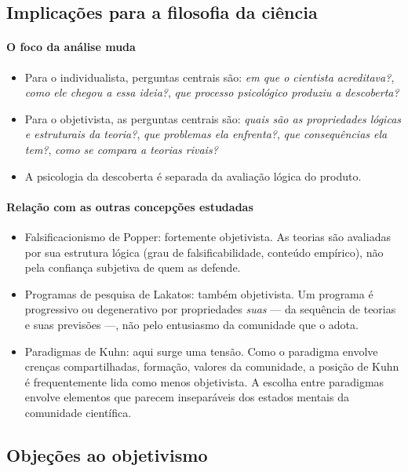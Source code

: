 \documentclass[9pt,a4paper]{extarticle}
\newcommand{\impt}[1]{\textcolor{important}{#1}}
\newcommand{\ntc}[1]{\textcolor{notice}{#1}}
\begin{document}
\subsection{Implicações para a filosofia da ciência}

\paragraph{O foco da análise muda}
\begin{itemize}
    \item Para o individualista, perguntas centrais são: \emph{em que o cientista acreditava?}, \emph{como ele chegou a essa ideia?}, \emph{que processo psicológico produziu a descoberta?}
    \item Para o objetivista, as perguntas centrais são: \emph{quais são as propriedades lógicas e estruturais da teoria?}, \emph{que problemas ela enfrenta?}, \emph{que consequências ela tem?}, \emph{como se compara a teorias rivais?}
    \item \impt{A psicologia da descoberta é separada da avaliação lógica do produto.}
\end{itemize}

\paragraph{Relação com as outras concepções estudadas}
\begin{itemize}
    \item \ntc{Falsificacionismo de Popper}: fortemente objetivista. As teorias são avaliadas por sua estrutura lógica (grau de falsificabilidade, conteúdo empírico), não pela confiança subjetiva de quem as defende.
    \item \ntc{Programas de pesquisa de Lakatos}: também objetivista. Um programa é progressivo ou degenerativo por propriedades \emph{suas} --- da sequência de teorias e suas previsões ---, não pelo entusiasmo da comunidade que o adota.
    \item \ntc{Paradigmas de Kuhn}: aqui surge uma tensão. Como o paradigma envolve crenças compartilhadas, formação, valores da comunidade, a posição de Kuhn é frequentemente lida como menos objetivista. A escolha entre paradigmas envolve elementos que parecem inseparáveis dos estados mentais da comunidade científica.
\end{itemize}

\subsection{Objeções ao objetivismo}
\end{document}

